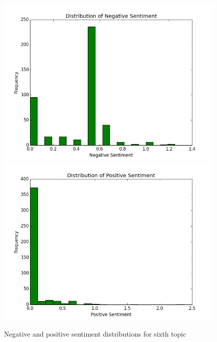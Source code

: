 \documentclass{article}
\begin{document}
\begin{enumerate}
		\begin{figure}[H]
			\includegraphics[scale=0.35]{5neg.png}
			\includegraphics[scale=0.35]{5pos.png}
			\begin{center}
			\caption{Negative and positive sentiment distributions for sixth topic}
			\end{center}
		\end{figure}
		

\end{enumerate}
\end{document}
